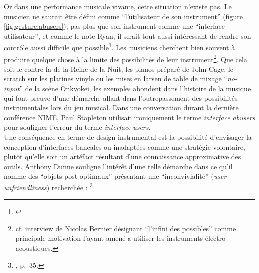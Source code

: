 \indent Or dans une performance musicale vivante, cette situation n'existe pas. Le musicien ne saurait être défini comme ``l'utilisateur de son instrument'' (figure \ref{fig:gesture:abusers}), pas plus que son instrument comme une ``interface utilisateur'', et comme le note Ryan, il serait tout aussi intéressant de rendre son contrôle aussi difficile que possible\footnote{ \cite{ryan_remarks_1991}}. Les musiciens cherchent bien souvent à produire quelque chose à la limite des possibilités de leur instrument\footnote{cf. interview de Nicolas Bernier désignant ``l'infini des possibles'' comme principale motivation l'ayant amené à utiliser les instruments électro-acoustiques.}. Que cela soit le contre-fa de la Reine de la Nuit, les pianos préparé de John Cage, le scratch sur les platines vinyle ou les mises en larsen de table de mixage ``\textit{no-input}'' de la scène Onkyokei, les exemples abondent dans l'histoire de la musique qui font preuve d'une démarche allant dans l'outrepassement des possibilités instrumentales lors du jeu musical. Dans une conversation durant la dernière conférence \gls{NIME}, Paul Stapleton utilisait ironiquement le terme \textit{interface abusers} pour souligner l'erreur du terme \textit{interface users}.\\
\indent Une conséquence en terme de design instrumental est la possibilité d'envisager la conception d'interfaces bancales ou inadaptées comme une stratégie volontaire, plutôt qu'elle soit un artéfact résultant d'une connaissance approximative des outils. Anthony Dunne souligne l'intérêt d'une telle démarche dans ce qu'il nomme des ``objets post-optimaux'' présentant une ``inconvivialité'' (\textit{user-unfriendliness}) recherchée : \footnote{, \cite{dunne_hertzian_1999} p.~35.}


